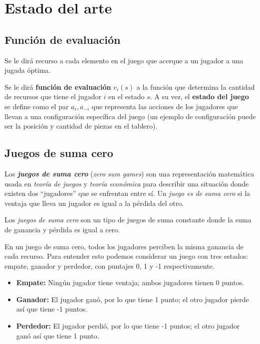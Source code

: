 \section{Estado del arte}
  \subsection{Función de evaluación}
    \begin{definition}
      Se le dirá recurso a cada elemento en el juego que acerque a un jugador a una jugada óptima.
    \end{definition}

    Se le dirá \textbf{función de evaluación}\cite{wiki-evaluation-function} \(v_i(s)\) a la función 
    que determina la cantidad de recursos que tiene el jugador \(i\) en el estado \(s\).
    A su vez, el \textbf{estado del juego} se define como el par \(a_i, a_{-i}\) que representa las
    acciones de los jugadores que llevan a una configuración específica del juego (un ejemplo de
    configuración puede ser la posición y cantidad de piezas en el tablero).

  \subsection{Juegos de suma cero}
    Los \textit{\textbf{juegos de suma cero}}\cite{wiki-zero-sum-game} (\textit{zero sum games}) 
    son una representación matemática usada en \textit{teoría de juegos} y \textit{teoría 
    económica} para describir una situación donde existen dos \enquote{jugadores} que se enfrentan
    entre sí.
    Un \textit{juego es de suma cero} si la ventaja que lleva un jugador es igual a la pérdida del
    otro.

    Los \textit{juegos de suma cero} son un tipo de juegos de suma constante donde la suma de 
    ganancia y pérdida es igual a cero.

    En un juego de suma cero, todos los jugadores perciben la misma ganancia de cada recurso.   
    Para entender esto podemos considerar un juego con tres estados: empate, ganador y perdedor, 
    con puntajes 0, 1 y -1 respectivamente.

    \begin{itemize}
      \item \textbf{Empate:} Ningún jugador tiene ventaja; ambos jugadores tienen 0 puntos.
      \item \textbf{Ganador:} El jugador ganó, por lo que tiene 1 punto; el otro jugador pierde 
        así que tiene -1 puntos.
      \item \textbf{Perdedor:} El jugador perdió, por lo que tiene -1 puntos; el otro jugador ganó 
        así que tiene 1 punto.
    \end{itemize}
    
